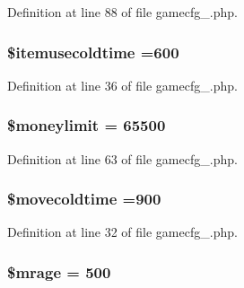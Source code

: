 Definition at line 88 of file gamecfg\+\_.\+php.

\hypertarget{gamecfg__1_8php_a8ff81f5ce688c08dcf261ffa27fa0764}{
\subsubsection[{\$itemusecoldtime}]{\setlength{\rightskip}{0pt plus 5cm}\$itemusecoldtime =600}}\label{gamecfg__1_8php_a8ff81f5ce688c08dcf261ffa27fa0764}


Definition at line 36 of file gamecfg\+\_.\+php.

\hypertarget{gamecfg__1_8php_a95757a9a9957cc6b45b689c9670236b1}{
\subsubsection[{\$moneylimit}]{\setlength{\rightskip}{0pt plus 5cm}\$moneylimit = 65500}}\label{gamecfg__1_8php_a95757a9a9957cc6b45b689c9670236b1}


Definition at line 63 of file gamecfg\+\_.\+php.

\hypertarget{gamecfg__1_8php_af659ed4a0b9dd7fd43f2319dfe0a7b67}{
\subsubsection[{\$movecoldtime}]{\setlength{\rightskip}{0pt plus 5cm}\$movecoldtime =900}}\label{gamecfg__1_8php_af659ed4a0b9dd7fd43f2319dfe0a7b67}


Definition at line 32 of file gamecfg\+\_.\+php.

\hypertarget{gamecfg__1_8php_ab94e397fe60bbe8e7846a0463fcd759d}{
\subsubsection[{\$mrage}]{\setlength{\rightskip}{0pt plus 5cm}\$mrage = 500}}\label{gamecfg__1_8php_ab94e397fe60bbe8e7846a0463fcd759d}


